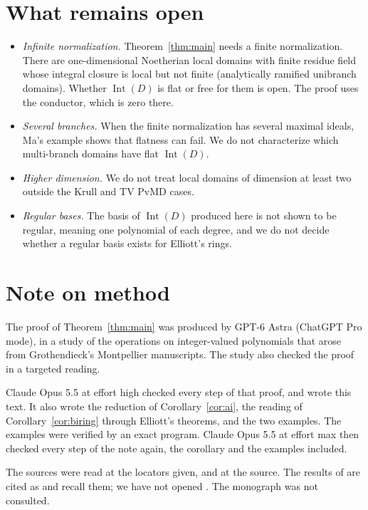 \documentclass[11pt,a4paper]{article}
\theoremstyle{plain}
\theoremstyle{remark}
\newcommand{\Int}{\operatorname{Int}}
\begin{document}
\section{What remains open}

\begin{itemize}
\item \emph{Infinite normalization.} Theorem~\ref{thm:main} needs a finite normalization. There are one-dimensional
Noetherian local domains with finite residue field whose integral closure is local but not finite (analytically
ramified unibranch domains). Whether $\Int(D)$ is flat or free for them is open. The proof uses the conductor, which
is zero there.
\item \emph{Several branches.} When the finite normalization has several maximal ideals, Ma's example shows that
flatness can fail. We do not characterize which multi-branch domains have flat $\Int(D)$.
\item \emph{Higher dimension.} We do not treat local domains of dimension at least two outside the Krull and TV PvMD
cases.
\item \emph{Regular bases.} The basis of $\Int(D)$ produced here is not shown to be regular, meaning one polynomial
of each degree, and we do not decide whether a regular basis exists for Elliott's rings.
\end{itemize}

\section*{Note on method}
The proof of Theorem~\ref{thm:main} was produced by GPT-6 Astra (ChatGPT Pro mode), in a study of the operations on
integer-valued polynomials that arose from Grothendieck's Montpellier manuscripts. The study also checked the proof
in a targeted reading.

Claude Opus 5.5 at effort high checked every step of that proof, and wrote this text. It also wrote the reduction
of Corollary~\ref{cor:ai}, the reading of Corollary~\ref{cor:biring} through Elliott's theorems, and the two
examples. The examples were verified by an exact program. Claude Opus 5.5 at effort max then checked every step of the
note again, the corollary and the examples included.

The sources \cite{CFFG,E11a,E11b,E16b,Ma,JLSWXY,MO} were read at the locators given, and \cite[Tag~032Y]{Stacks} at
the source. The results of \cite{E07,E10} are cited as \cite[pp.~9--10]{CFFG} and \cite[p.~16]{E11b} recall them;
we have not opened \cite{E07,E10}. The monograph \cite{CC} was not consulted.
\end{document}
